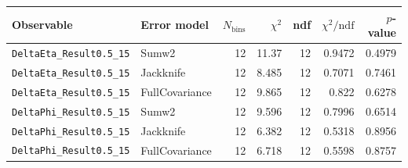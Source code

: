 \begin{tabular}{|l|l|r|r|r|r|r|}
\hline
Observable & Error model & $N_{\mathrm{bins}}$ & $\chi^2$ & ndf & $\chi^2/\mathrm{ndf}$ & $p$-value \\
\hline
\texttt{DeltaEta\_Result0.5\_15} & Sumw2 & 12 & 11.37 & 12 & 0.9472 & 0.4979 \\
\texttt{DeltaEta\_Result0.5\_15} & Jackknife & 12 & 8.485 & 12 & 0.7071 & 0.7461 \\
\texttt{DeltaEta\_Result0.5\_15} & FullCovariance & 12 & 9.865 & 12 & 0.822 & 0.6278 \\
\texttt{DeltaPhi\_Result0.5\_15} & Sumw2 & 12 & 9.596 & 12 & 0.7996 & 0.6514 \\
\texttt{DeltaPhi\_Result0.5\_15} & Jackknife & 12 & 6.382 & 12 & 0.5318 & 0.8956 \\
\texttt{DeltaPhi\_Result0.5\_15} & FullCovariance & 12 & 6.718 & 12 & 0.5598 & 0.8757 \\
\hline
\end{tabular}
